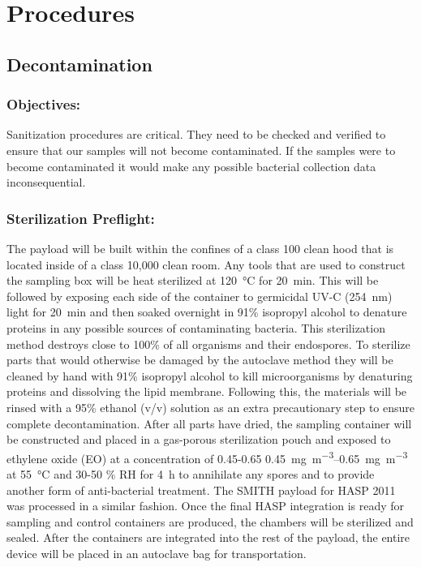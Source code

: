 \section{Procedures}
\label{sec:Procedures}

\subsection{Decontamination}
\label{subsec:Decontamination}

\subsubsection{Objectives:}
Sanitization procedures are critical. They need to be checked and verified to ensure that our samples will not become contaminated. If the samples were to become contaminated it would make any possible bacterial collection data inconsequential.

\subsubsection{Sterilization Preflight:}
The payload will be built within the confines of a class 100 clean hood that is located inside of a class 10,000 clean room. Any tools that are used to construct the sampling box will be heat sterilized at \SI{120}{\celsius} for \SI{20}{\minute}. This will be followed by exposing each side of the container to germicidal UV-C (\SI{254}{\nano\meter}) light for \SI{20}{\minute} and then soaked overnight in 91\% isopropyl alcohol to denature proteins in any possible sources of contaminating bacteria. This sterilization method destroys close to 100\% of all organisms and their endospores. To sterilize parts that would otherwise be damaged by the autoclave method they will be cleaned by hand with 91\% isopropyl alcohol to kill microorganisms by denaturing proteins and dissolving the lipid membrane. Following this, the materials will be rinsed with a 95\% ethanol (v/v) solution as an extra precautionary step to ensure complete decontamination. After all parts have dried, the sampling container will be constructed and placed in a gas-porous sterilization pouch and exposed to ethylene oxide (EO) at a concentration of 0.45-0.65 \SIrange{0.45}{0.65}{\milli\gram\per\meter\cubed} at \SI{55}{\celsius} and 30-50 \% RH for \SI{4}{\hour} to annihilate any spores and to provide another form of anti-bacterial treatment. The SMITH payload for HASP 2011 was processed in a similar fashion. Once the final HASP integration is ready for sampling and control containers are produced, the chambers will be sterilized and sealed. After the containers are integrated into the rest of the payload, the entire device will be placed in an autoclave bag for transportation.

